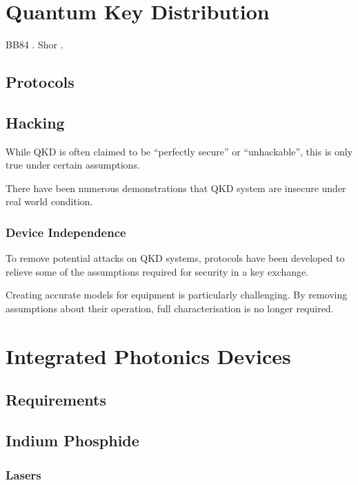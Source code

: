 \section{Quantum Key Distribution}

BB84 \cite{BB84}. Shor \cite{shor1994}.

\subsection{Protocols}

\subsection{Hacking}

While \ac{QKD} is often claimed to be ``perfectly secure'' or ``unhackable'', this is only true under certain assumptions. 

There have been numerous demonstrations that \ac{QKD} system are insecure under real world condition.

\subsubsection*{Device Independence}

To remove potential attacks on \ac{QKD} systems, protocols have been developed to relieve some of the assumptions required for security in a key exchange. 

Creating accurate models for equipment is particularly challenging. By removing assumptions about their operation, full characterisation is no longer required.

\section{Integrated Photonics Devices}

\subsection{Requirements}

\subsection{Indium Phosphide}

\subsubsection*{Lasers}

